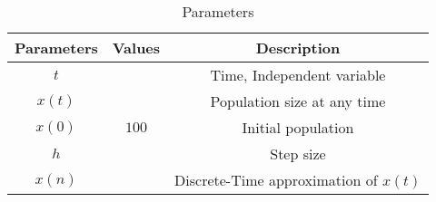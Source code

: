 \begin{table}[htbp]
    \centering
    \begin{tabular}{|c|c|c|} \hline
      \textbf{Parameters} & \textbf{Values} & \textbf{Description} \\ \hline
      $t$ &  & Time, Independent variable \\ \hline
      $x(t)$ &  & Population size at any time \\ \hline
      $x(0)$ & $100$ & Initial population \\ \hline
      $h$ &  & Step size \\ \hline
      $x(n)$ &  & Discrete-Time approximation of $x(t)$ \\ \hline
    \end{tabular}
    \vspace{3pt}
    \caption{Parameters}
\end{table}
